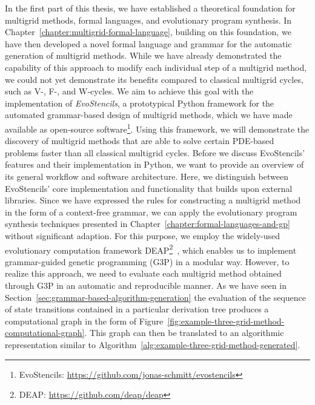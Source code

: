 In the first part of this thesis, we have established a theoretical foundation for multigrid methods, formal languages, and evolutionary program synthesis.
In Chapter~\ref{chapter:multigrid-formal-language}, building on this foundation, we have then developed a novel formal language and grammar for the automatic generation of multigrid methods. 
While we have already demonstrated the capability of this approach to modify each individual step of a multigrid method, we could not yet demonstrate its benefits compared to classical multigrid cycles, such as V-, F-, and W-cycles.
We aim to achieve this goal with the implementation of \emph{EvoStencils}, a prototypical Python framework for the automated grammar-based design of multigrid methods, which we have made available as open-source software\footnote{EvoStencils: \url{https://github.com/jonas-schmitt/evostencils}}.
Using this framework, we will demonstrate the discovery of multigrid methods that are able to solve certain PDE-based problems faster than all classical multigrid cycles.
Before we discuss EvoStencils' features and their implementation in Python, we want to provide an overview of its general workflow and software architecture.
Here, we distinguish between EvoStencils' core implementation and functionality that builds upon external libraries.
Since we have expressed the rules for constructing a multigrid method in the form of a context-free grammar, we can apply the evolutionary program synthesis techniques presented in Chapter~\ref{chapter:formal-languages-and-gp} without significant adaption.
For this purpose, we employ the widely-used evolutionary computation framework DEAP\footnote{DEAP: \url{https://github.com/deap/deap}}~\cite{rainville2012deap}, which enables us to implement grammar-guided genetic programming (G3P) in a modular way.
However, to realize this approach, we need to evaluate each multigrid method obtained through G3P in an automatic and reproducible manner.
As we have seen in Section~\ref{sec:grammar-based-algorithm-generation} the 
evaluation of the sequence of state transitions contained in a particular derivation tree produces a computational graph in the form of Figure~\ref{fig:example-three-grid-method-computational-graph}.
This graph can then be translated to an algorithmic representation similar to Algorithm~\ref{alg:example-three-grid-method-generated}.
